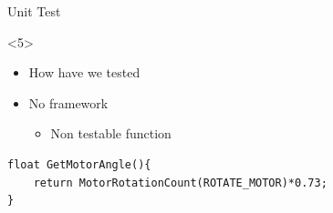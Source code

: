 \begin{frame}[fragile]{Unit Test}
\begin{onlyenv}<5>
\begin{itemize}
  \item How have we tested
  \item No framework
  \begin{itemize}
  \item Non testable function
\end{itemize}
\end{itemize}
\begin{center}
\begin{minipage}[H]{0.9\linewidth}
\begin{lstlisting}
float GetMotorAngle(){
    return MotorRotationCount(ROTATE_MOTOR)*0.73;
}
\end{lstlisting} 
\end{minipage}
\end{center}
\end{onlyenv}
\end{frame}

